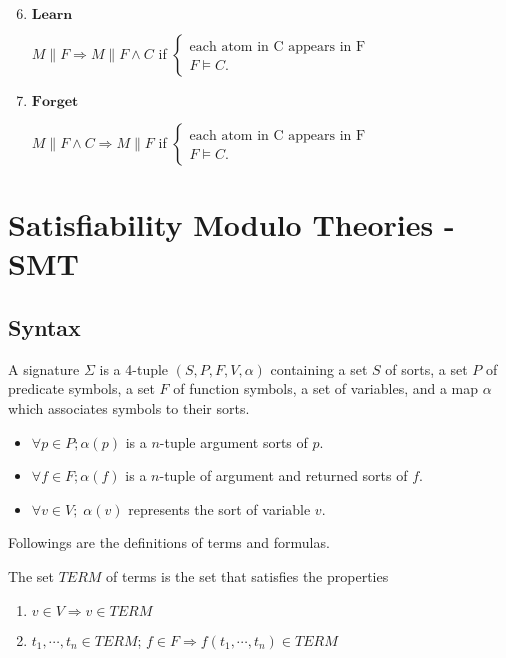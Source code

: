 \begin{enumerate}
\setcounter{enumi}{5}
\item $\mathbf{Learn}$

$M \parallel F \Longrightarrow M \parallel F \wedge C$ if $\left\{ 
  \begin{array}{l}
    \text{each atom in C appears in F} \\
    F \models C.
  \end{array} \right.$ 
  
\item $\mathbf{Forget}$

$M \parallel F \wedge C \Longrightarrow M \parallel F$ if $\left\{ 
  \begin{array}{l}
    \text{each atom in C appears in F} \\
    F \models C.
  \end{array} \right.$   
\end{enumerate}

\section{Satisfiability Modulo Theories - SMT}
\subsection{Syntax} \label{subsection:smt-syntax}
\begin{definition}
A signature $\Sigma$ is a 4-tuple $(S, P, F, V, \alpha)$ containing a set $S$ of sorts, a set $P$ of predicate symbols, a set $F$ of function symbols, a set of variables, and a map $\alpha$ which associates symbols to their sorts.
\begin{itemize}
\item $\forall p \in P; \alpha(p)$ is a $n$-tuple argument sorts of $p$.
\item $\forall f \in F; \alpha(f)$ is a $n$-tuple of argument and returned sorts of $f$.
\item $\forall v \in V; \; \alpha(v)$ represents the sort of variable $v$.
\end{itemize}
\end{definition}
 
Followings are the definitions of terms and formulas.

\begin{definition}
The set $TERM$ of terms is the set that satisfies the properties
\begin{enumerate}
\item $v \in V \Rightarrow v \in TERM$
\item $t_1,\cdots,t_n \in TERM$; $f \in F \Rightarrow f(t_1,\cdots, t_n) \in TERM$
\end{enumerate}
\end{definition}

